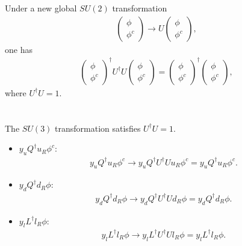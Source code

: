 \documentclass[11pt]{article}
\begin{document}
\section{ }
Under a new global $SU(2)$ transformation
\begin{eqnarray}
  \begin{pmatrix}
    \phi \\ \phi^c
  \end{pmatrix}
  \to U
  \begin{pmatrix}
    \phi \\ \phi^c
  \end{pmatrix},
\end{eqnarray}
one has 
\begin{eqnarray}
  \begin{pmatrix}
    \phi \\ \phi^c
  \end{pmatrix} ^\dagger U^\dagger U 
  \begin{pmatrix}
    \phi \\ \phi^c
  \end{pmatrix}
  =
  \begin{pmatrix}
    \phi \\ \phi^c
  \end{pmatrix} ^\dagger
  \begin{pmatrix}
    \phi \\ \phi^c
  \end{pmatrix},
\end{eqnarray}
where $U^\dagger U=1$.

\section{ }
The $SU(3)$ transformation satisfies $U^\dagger U=1$.
\begin{itemize}
  \item $y_u Q^\dagger u_R \phi^c$:
  \begin{eqnarray}
    y_u Q^\dagger u_R \phi^c \to y_u Q^\dagger U^\dagger U u_R \phi^c = y_u Q^\dagger u_R \phi^c.
  \end{eqnarray}
  \item $y_d Q^\dagger d_R \phi$:
  \begin{eqnarray}
    y_d Q^\dagger d_R \phi \to y_d Q^\dagger U^\dagger U d_R \phi = y_d Q^\dagger d_R \phi.
  \end{eqnarray}
  \item $y_l L^\dagger l_R \phi$:
  \begin{eqnarray}
    y_l L^\dagger l_R \phi \to y_l L^\dagger U^\dagger U l_R \phi = y_l L^\dagger l_R \phi.
  \end{eqnarray}
\end{itemize}
\end{document}
